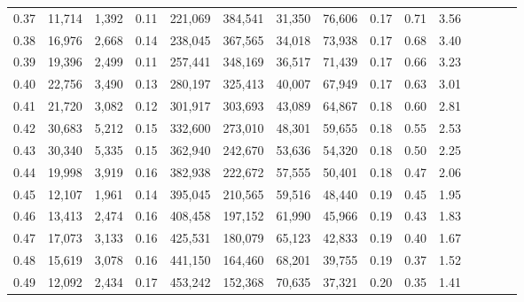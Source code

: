 \begin{tabular}{rrrcrrrrrrrrrrr}
0.37 &  11,714 &  1,392 &                                       0.11 &  221,069 &  384,541 &   31,350 &   76,606 &  0.17 &  0.71 &                         3.56 \\
0.38 &  16,976 &  2,668 &                                       0.14 &  238,045 &  367,565 &   34,018 &   73,938 &  0.17 &  0.68 &                         3.40 \\
0.39 &  19,396 &  2,499 &                                       0.11 &  257,441 &  348,169 &   36,517 &   71,439 &  0.17 &  0.66 &                         3.23 \\
0.40 &  22,756 &  3,490 &                                       0.13 &  280,197 &  325,413 &   40,007 &   67,949 &  0.17 &  0.63 &                         3.01 \\
0.41 &  21,720 &  3,082 &                                       0.12 &  301,917 &  303,693 &   43,089 &   64,867 &  0.18 &  0.60 &                         2.81 \\
0.42 &  30,683 &  5,212 &                                       0.15 &  332,600 &  273,010 &   48,301 &   59,655 &  0.18 &  0.55 &                         2.53 \\
0.43 &  30,340 &  5,335 &                                       0.15 &  362,940 &  242,670 &   53,636 &   54,320 &  0.18 &  0.50 &                         2.25 \\
0.44 &  19,998 &  3,919 &                                       0.16 &  382,938 &  222,672 &   57,555 &   50,401 &  0.18 &  0.47 &                         2.06 \\
0.45 &  12,107 &  1,961 &                                       0.14 &  395,045 &  210,565 &   59,516 &   48,440 &  0.19 &  0.45 &                         1.95 \\
0.46 &  13,413 &  2,474 &                                       0.16 &  408,458 &  197,152 &   61,990 &   45,966 &  0.19 &  0.43 &                         1.83 \\
0.47 &  17,073 &  3,133 &                                       0.16 &  425,531 &  180,079 &   65,123 &   42,833 &  0.19 &  0.40 &                         1.67 \\
0.48 &  15,619 &  3,078 &                                       0.16 &  441,150 &  164,460 &   68,201 &   39,755 &  0.19 &  0.37 &                         1.52 \\
0.49 &  12,092 &  2,434 &                                       0.17 &  453,242 &  152,368 &   70,635 &   37,321 &  0.20 &  0.35 &                         1.41 \\

\end{tabular}

